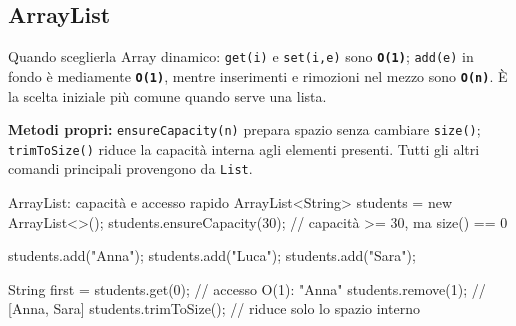 ﻿\documentclass[10pt,a4paper]{article}
\newcommand{\cmd}[1]{\texttt{#1}}
\newcommand{\complexity}[1]{\textcolor{accent}{\texttt{\textbf{#1}}}}
\newcommand{\topicsubsection}[1]{\Needspace{10\baselineskip}\subsection{#1}}
\newenvironment{topicblock}{%
  \par\medskip\noindent\begin{minipage}{\textwidth}%
}{%
  \end{minipage}\par\medskip%
}
\begin{document}
\begin{topicblock}
\topicsubsection{ArrayList}
\begin{difference}{Quando sceglierla}
Array dinamico: \cmd{get(i)} e \cmd{set(i,e)} sono \complexity{O(1)};
\cmd{add(e)} in fondo è mediamente \complexity{O(1)}, mentre inserimenti e
rimozioni nel mezzo sono \complexity{O(n)}. È la scelta iniziale più comune
quando serve una lista.

\textbf{Metodi propri:}
\cmd{ensureCapacity(n)} prepara spazio senza cambiare \cmd{size()};
\cmd{trimToSize()} riduce la capacità interna agli elementi presenti.
Tutti gli altri comandi principali provengono da \cmd{List}.
\end{difference}

\begin{codebox}{ArrayList: capacità e accesso rapido}
ArrayList<String> students = new ArrayList<>();
students.ensureCapacity(30); // capacità >= 30, ma size() == 0

students.add("Anna");
students.add("Luca");
students.add("Sara");

String first = students.get(0); // accesso O(1): "Anna"
students.remove(1);              // [Anna, Sara]
students.trimToSize();           // riduce solo lo spazio interno
\end{codebox}

\end{topicblock}
\end{document}
